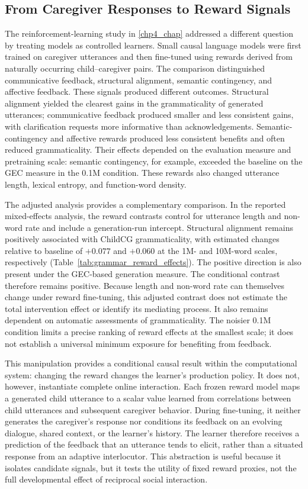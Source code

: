 \subsection{From Caregiver Responses to Reward Signals}

The reinforcement-learning study in \cref{chp4_chap} addressed a different question by treating models as controlled learners. Small causal language models were first trained on caregiver utterances and then fine-tuned using rewards derived from naturally occurring child--caregiver pairs. The comparison distinguished communicative feedback, structural alignment, semantic contingency, and affective feedback. These signals produced different outcomes. Structural alignment yielded the clearest gains in the grammaticality of generated utterances; communicative feedback produced smaller and less consistent gains, with clarification requests more informative than acknowledgements. Semantic-contingency and affective rewards produced less consistent benefits and often reduced grammaticality. Their effects depended on the evaluation measure and pretraining scale: semantic contingency, for example, exceeded the baseline on the GEC measure in the 0.1M condition. These rewards also changed utterance length, lexical entropy, and function-word density.

The adjusted analysis provides a complementary comparison. In the reported mixed-effects analysis, the reward contrasts control for utterance length and non-word rate and include a generation-run intercept. Structural alignment remains positively associated with ChildCG grammaticality, with estimated changes relative to baseline of $+0.077$ and $+0.060$ at the 1M- and 10M-word scales, respectively (Table~\ref{tab:grammar_reward_effects}). The positive direction is also present under the GEC-based generation measure. The conditional contrast therefore remains positive. Because length and non-word rate can themselves change under reward fine-tuning, this adjusted contrast does not estimate the total intervention effect or identify its mediating process. It also remains dependent on automatic assessments of grammaticality. The noisier 0.1M condition limits a precise ranking of reward effects at the smallest scale; it does not establish a universal minimum exposure for benefiting from feedback.

This manipulation provides a conditional causal result within the computational system: changing the reward changes the learner's production policy. It does not, however, instantiate complete online interaction. Each frozen reward model maps a generated child utterance to a scalar value learned from correlations between child utterances and subsequent caregiver behavior. During fine-tuning, it neither generates the caregiver's response nor conditions its feedback on an evolving dialogue, shared context, or the learner's history. The learner therefore receives a prediction of the feedback that an utterance tends to elicit, rather than a situated response from an adaptive interlocutor. This abstraction is useful because it isolates candidate signals, but it tests the utility of fixed reward proxies, not the full developmental effect of reciprocal social interaction.

